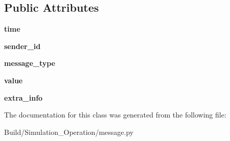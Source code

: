 \subsection*{Public Attributes}
\begin{DoxyCompactItemize}
\item 
\mbox{\label{class_build_1_1_simulation___operation_1_1message_1_1_message_a6122da2afc91c2fd23519a8c38343217}} 
{\bfseries time}
\item 
\mbox{\label{class_build_1_1_simulation___operation_1_1message_1_1_message_af9430f21634626fd9497430b21f5b41a}} 
{\bfseries sender\+\_\+id}
\item 
\mbox{\label{class_build_1_1_simulation___operation_1_1message_1_1_message_aa05203803421b175e29735ccb37a0dad}} 
{\bfseries message\+\_\+type}
\item 
\mbox{\label{class_build_1_1_simulation___operation_1_1message_1_1_message_ac09cc0f69cce74d44a670f649fb89cc4}} 
{\bfseries value}
\item 
\mbox{\label{class_build_1_1_simulation___operation_1_1message_1_1_message_ad1acb28de8d98f557bc0d98b8a641fba}} 
{\bfseries extra\+\_\+info}
\end{DoxyCompactItemize}


The documentation for this class was generated from the following file\+:\begin{DoxyCompactItemize}
\item 
Build/\+Simulation\+\_\+\+Operation/message.\+py\end{DoxyCompactItemize}
